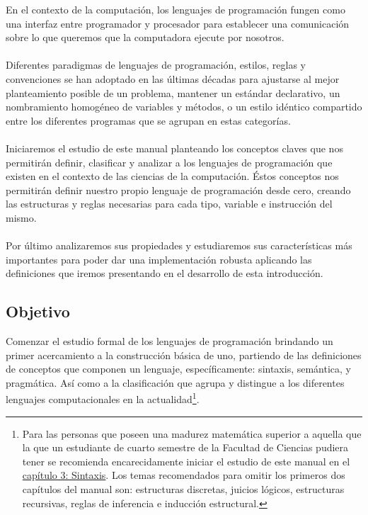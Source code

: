 En el contexto de la computación, los lenguajes de programación fungen como una interfaz entre programador y procesador para establecer una comunicación sobre lo que queremos que la computadora ejecute por nosotros.\\\\
Diferentes paradigmas de lenguajes de programación, estilos, reglas y convenciones se han adoptado en las últimas décadas para ajustarse al mejor planteamiento posible de un problema, mantener un estándar declarativo, un nombramiento homogéneo de variables y métodos, o un estilo idéntico compartido entre los diferentes programas que se agrupan en estas categorías.\\\\
Iniciaremos el estudio de este manual planteando los conceptos claves que nos permitirán definir, clasificar y analizar a los lenguajes de programación que existen en el contexto de las ciencias de la computación. Éstos conceptos nos permitirán definir nuestro propio lenguaje de programación desde cero, creando las estructuras y reglas necesarias para cada tipo, variable e instrucción del mismo.\\\\
Por último analizaremos sus propiedades y estudiaremos sus características más importantes para poder dar una implementación robusta aplicando las definiciones que iremos presentando en el desarrollo de esta introducción.\\

\subsection*{Objetivo}
    Comenzar el estudio formal de los lenguajes de programación brindando un primer acercamiento a la construcción básica de uno, partiendo de las definiciones de conceptos que componen un lenguaje, específicamente: sintaxis, semántica, y pragmática. Así como a la clasificación que agrupa y distingue a los diferentes lenguajes computacionales en la actualidad\footnote{Para las personas que poseen una madurez matemática superior a aquella que la que un estudiante de cuarto semestre de la Facultad de Ciencias pudiera tener se recomienda encarecidamente iniciar el estudio de este manual en el \hyperref[sec:sintax]{capítulo 3: Sintaxis}. Los temas recomendados para omitir los primeros dos capítulos del manual son: estructuras discretas, juicios lógicos, estructuras recursivas, reglas de inferencia e inducción estructural. }.

